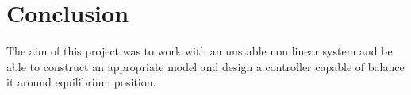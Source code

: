 \chapter{Conclusion}

The aim of this project was to work with an unstable non linear system and be able to construct an appropriate model and design a controller capable of balance it around equilibrium position.
